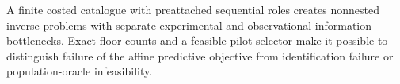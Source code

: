 A finite costed catalogue with preattached sequential roles creates nonnested inverse problems with separate experimental and observational information bottlenecks.  Exact floor counts and a feasible pilot selector make it possible to distinguish failure of the affine predictive objective from identification failure or population-oracle infeasibility.